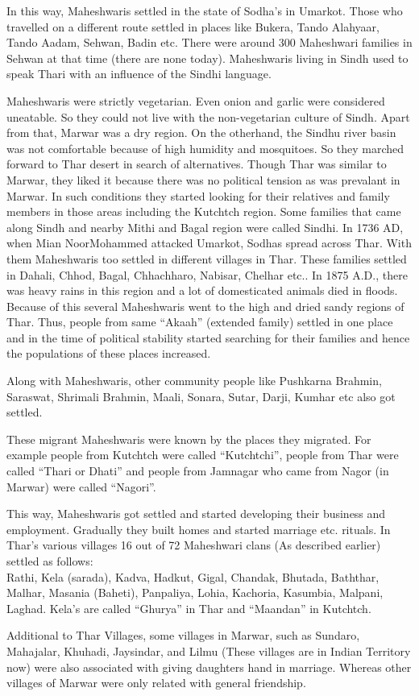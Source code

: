 In this way, Maheshwaris settled in the state of Sodha's in Umarkot. Those who travelled on a different route settled in places like Bukera, Tando Alahyaar, Tando Aadam, Sehwan, Badin etc. There were around 300 Maheshwari families in Sehwan at that time (there are none today). Maheshwaris living in Sindh used to speak Thari with an influence of the Sindhi language.

Maheshwaris were strictly vegetarian. Even onion and garlic were considered uneatable. So they could not live with the non-vegetarian culture of Sindh. Apart from that, Marwar was a dry region. On the otherhand, the Sindhu river basin was not comfortable because of high humidity and mosquitoes. So they marched forward to Thar desert in search of alternatives. Though Thar was similar to Marwar, they liked it because there was no political tension as was prevalant in Marwar. In such conditions they started looking for their relatives and family members in those areas including the Kutchtch region. Some families that came along Sindh and nearby Mithi and Bagal region were called Sindhi. In 1736 AD, when Mian NoorMohammed attacked Umarkot, Sodhas spread across Thar. With them Maheshwaris too settled in different villages in Thar. These families settled in Dahali, Chhod, Bagal, Chhachharo, Nabisar, Chelhar etc.. In 1875 A.D., there was heavy rains in this region and a lot of domesticated animals died in floods. Because of this several Maheshwaris went to the high and dried sandy regions of Thar. Thus, people from same ``Akaah'' (extended family) settled in one place and in the time of political stability started searching for their families and hence the populations of these places increased.

Along with Maheshwaris, other community people like Pushkarna Brahmin, Saraswat, Shrimali Brahmin, Maali, Sonara, Sutar, Darji, Kumhar etc also got settled.

These migrant Maheshwaris were known by the places they migrated. For example people from Kutchtch were called ``Kutchtchi'', people from Thar were called ``Thari or Dhati'' and people from Jamnagar who came from Nagor (in Marwar) were called ``Nagori''.

This way, Maheshwaris got settled and started developing their business and employment. Gradually they built homes and started marriage etc. rituals. In Thar's various villages 16 out of 72 Maheshwari clans (As described earlier) settled as follows:\\
Rathi, Kela (sarada), Kadva, Hadkut, Gigal, Chandak, Bhutada, Baththar, Malhar, Masania (Baheti), Panpaliya, Lohia, Kachoria, Kasumbia, Malpani, Laghad. Kela's are called ``Ghurya'' in Thar and ``Maandan'' in Kutchtch.

Additional to Thar Villages, some villages in Marwar, such as Sundaro, Mahajalar, Khuhadi, Jaysindar, and Lilmu (These villages are in Indian Territory now) were also associated with giving daughters hand in marriage. Whereas other villages of Marwar were only related with general friendship.
